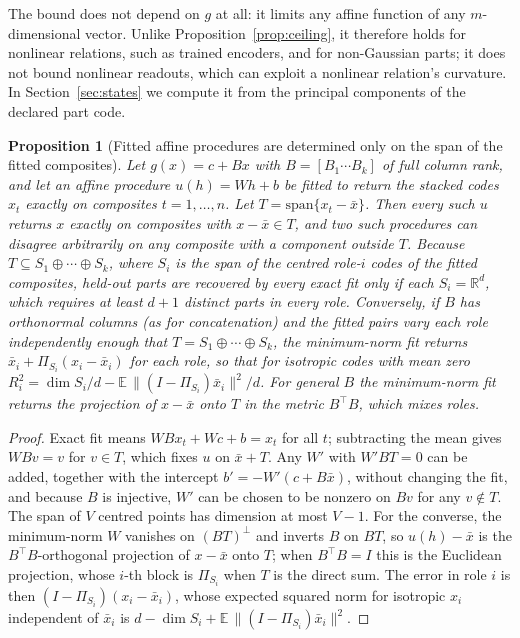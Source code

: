 \documentclass[10pt]{article}
\theoremstyle{plain}
\newtheorem{proposition}{Proposition}
\theoremstyle{remark}
\newcommand{\R}{\mathbb{R}}
\begin{document}
\noindent
The bound does not depend on $g$ at all: it limits any affine function of any $m$-dimensional vector. Unlike Proposition~\ref{prop:ceiling}, it therefore holds for nonlinear relations, such as trained encoders, and for non-Gaussian parts; it does not bound nonlinear readouts, which can exploit a nonlinear relation's curvature. In Section~\ref{sec:states} we compute it from the principal components of the declared part code.

\begin{proposition}[Fitted affine procedures are determined only on the span of the fitted composites]
\label{prop:span}
Let $g(x) = c + Bx$ with $B = [B_1 \cdots B_k]$ of full column rank, and let an affine procedure $u(h) = Wh + b$ be fitted to return the stacked codes $x_t$ exactly on composites $t = 1, \ldots, n$. Let $T = \mathrm{span}\{x_t - \bar{x}\}$. Then every such $u$ returns $x$ exactly on composites with $x - \bar{x} \in T$, and two such procedures can disagree arbitrarily on any composite with a component outside $T$. Because $T \subseteq S_1 \oplus \cdots \oplus S_k$, where $S_i$ is the span of the centred role-$i$ codes of the fitted composites, held-out parts are recovered by every exact fit only if each $S_i = \R^d$, which requires at least $d + 1$ distinct parts in every role. Conversely, if $B$ has orthonormal columns (as for concatenation) and the fitted pairs vary each role independently enough that $T = S_1 \oplus \cdots \oplus S_k$, the minimum-norm fit returns $\bar{x}_i + \Pi_{S_i}(x_i - \bar{x}_i)$ for each role, so that for isotropic codes with mean zero $R^2_i = \dim S_i/d - \mathbb{E}\,\lVert (I - \Pi_{S_i})\bar{x}_i \rVert^2/d$. For general $B$ the minimum-norm fit returns the projection of $x - \bar{x}$ onto $T$ in the metric $B^{\top}B$, which mixes roles.
\end{proposition}

\begin{proof}
Exact fit means $WBx_t + Wc + b = x_t$ for all $t$; subtracting the mean gives $WBv = v$ for $v \in T$, which fixes $u$ on $\bar{x} + T$. Any $W'$ with $W'BT = 0$ can be added, together with the intercept $b' = -W'(c + B\bar{x})$, without changing the fit, and because $B$ is injective, $W'$ can be chosen to be nonzero on $B v$ for any $v \notin T$. The span of $V$ centred points has dimension at most $V - 1$. For the converse, the minimum-norm $W$ vanishes on $(BT)^{\perp}$ and inverts $B$ on $BT$, so $u(h) - \bar{x}$ is the $B^{\top}B$-orthogonal projection of $x - \bar{x}$ onto $T$; when $B^{\top}B = I$ this is the Euclidean projection, whose $i$-th block is $\Pi_{S_i}$ when $T$ is the direct sum. The error in role $i$ is then $(I - \Pi_{S_i})(x_i - \bar{x}_i)$, whose expected squared norm for isotropic $x_i$ independent of $\bar{x}_i$ is $d - \dim S_i + \mathbb{E}\,\lVert (I - \Pi_{S_i})\bar{x}_i \rVert^2$.
\end{proof}
\end{document}
